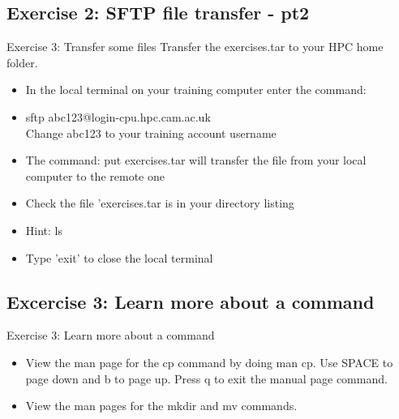 \subsection{Exercise 2: SFTP file transfer - pt2}
\begin{frame}{Exercise 3: Transfer some files}
Transfer the exercises.tar to your HPC home folder.
\begin{itemize}
\item{In the local terminal on your training computer enter the command:}
\item \alert{\footnotesize sftp abc123@login-cpu.hpc.cam.ac.uk}\\
Change abc123 to your training account username
\item{The command: \alert{\footnotesize put exercises.tar} will transfer the file from your local computer to the remote one}
\item{Check the file 'exercises.tar is in your directory listing}
\item{Hint: ls}
\item Type 'exit' to close the local terminal
\end{itemize}
\end{frame}

\subsection{Excercise 3: Learn more about a command}
\begin{frame}{Exercise 3: Learn more about a command}
\begin{itemize}
\item[(a)]{View the man page for the \alert{cp} command by doing \alert{man cp}. 
Use \alert{SPACE} to page down and \alert{b} to page up. Press \alert{q} to exit the manual page command.}
\item[(b)]{View the man pages for the \alert{mkdir} and \alert{mv} commands. }
\end{itemize}
\end{frame}

